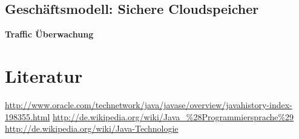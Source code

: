 \documentclass[12pt,a4paper,bibliography=totocnumbered,listof=totocnumbered]{scrartcl}
\begin{document}
\subsection{Geschäftsmodell: Sichere Cloudspeicher}
\textbf{Traffic Überwachung}\\
\pagebreak

\section{Literatur}

\begin{thebibliography}{xxxxxxxxxxxxxxxxxxx}
 \url{http://www.oracle.com/technetwork/java/javase/overview/javahistory-index-198355.html}
 \url{http://de.wikipedia.org/wiki/Java_%28Programmiersprache%29}
 \url{ http://de.wikipedia.org/wiki/Java-Technologie}

\end{thebibliography}

\pagebreak

\setcounter{page}{1}
\end{document}
